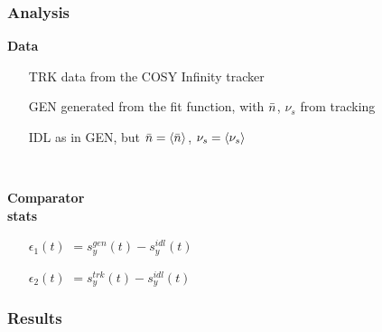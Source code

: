 \documentclass[14pt]{beamer}
\begin{document}
\begin{frame}\frametitle{Analysis}
	\begin{minipage}[t]{.5\linewidth}
		\textbf{Data}
		\begin{itemize}
			\item[TRK] data from the COSY Infinity tracker
			\item[GEN] generated from the fit function, with $\bar n$, $\nu_s$ from tracking
			\item[IDL] as in GEN, but $\nbar = \avg{\nbar}$, $\nu_s = \avg{\nu_s}$ 
		\end{itemize}
	\end{minipage}~~~~
	\begin{minipage}[t]{.5\linewidth}
		\textbf{Comparator\\ stats}
		\begin{itemize}
			\item[$\epsilon_1(t)$] $= s_y^{gen}(t) - s_y^{idl}(t)$
			\item[$\epsilon_2(t)$] $= s_y^{trk}(t) - s_y^{idl}(t)$
		\end{itemize}
	\end{minipage}
\end{frame}
\begin{frame}\frametitle{Results}
\end{frame}
\end{document}
